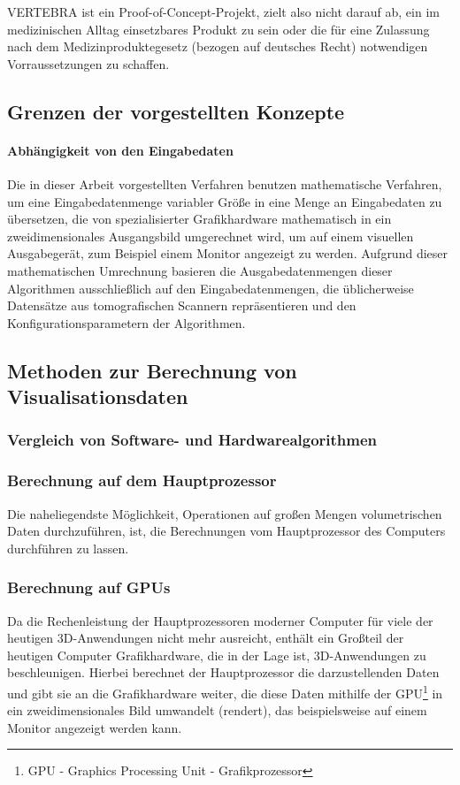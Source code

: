 \documentclass[a4paper,titlepage,12pt]{scrartcl}
\newtheorem[L]{boxedDefinition}{Definition}
\begin{document}
VERTEBRA ist ein Proof-of-Concept-Projekt, zielt also nicht darauf ab, ein im medizinischen Alltag einsetzbares Produkt zu sein oder die für eine Zulassung nach dem Medizinproduktegesetz (bezogen auf deutsches Recht) notwendigen Vorraussetzungen zu schaffen.
\subsection{Grenzen der vorgestellten Konzepte}\label{ssec:limits}
\paragraph{Abhängigkeit von den Eingabedaten}
Die in dieser Arbeit vorgestellten Verfahren benutzen mathematische Verfahren, um eine Eingabedatenmenge variabler Größe in eine Menge an Eingabedaten zu übersetzen, die von spezialisierter Grafikhardware mathematisch in ein zweidimensionales Ausgangsbild umgerechnet wird, um auf einem visuellen Ausgabegerät, zum Beispiel einem Monitor angezeigt zu werden. Aufgrund dieser mathematischen Umrechnung basieren die Ausgabedatenmengen dieser Algorithmen ausschließlich auf den Eingabedatenmengen, die üblicherweise Datensätze aus tomografischen Scannern repräsentieren und den Konfigurationsparametern der Algorithmen.
\subsection{Methoden zur Berechnung von Visualisationsdaten}
\subsubsection{Vergleich von Software- und Hardwarealgorithmen}\label{ssec:swhwcomparison}

\subsubsection{Berechnung auf dem Hauptprozessor}\label{sssec:cpucalculation}
Die naheliegendste Möglichkeit, Operationen auf großen Mengen volumetrischen Daten durchzuführen, ist, die Berechnungen vom Hauptprozessor des Computers durchführen zu lassen. 
\subsubsection{Berechnung auf GPUs}\label{sssec:gpucalculation}
Da die Rechenleistung der Hauptprozessoren moderner Computer für viele der heutigen 3D-Anwendungen nicht mehr ausreicht, enthält ein Großteil der heutigen Computer Grafikhardware, die in der Lage ist, 3D-Anwendungen zu beschleunigen. Hierbei berechnet der Hauptprozessor die darzustellenden Daten und gibt sie an die Grafikhardware weiter, die diese Daten mithilfe der GPU\footnote{GPU - Graphics Processing Unit - Grafikprozessor} in ein zweidimensionales Bild umwandelt (rendert), das beispielsweise auf einem Monitor angezeigt werden kann.
\end{document}
